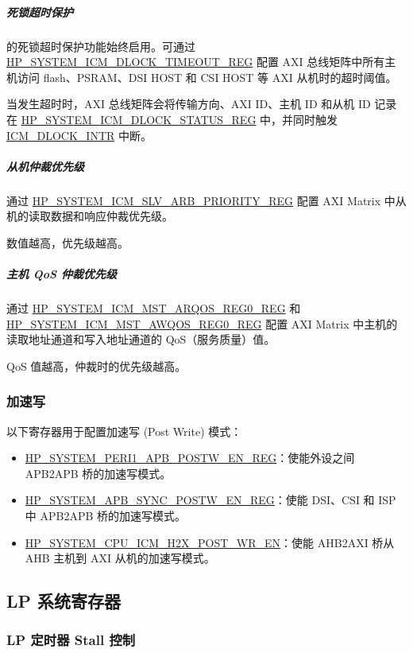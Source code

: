 \documentclass[main\_\_CN.tex]{subfiles}
\begin{document}
\subparagraph{死锁超时保护}

\chipname{} 的死锁超时保护功能始终启用。可通过 \hyperref[regdesc:HPSYSTEMICMDLOCKTIMEOUTREG]{HP\_SYSTEM\_ICM\_DLOCK\_TIMEOUT\_REG} 配置 AXI 总线矩阵中所有主机访问 flash、PSRAM、DSI HOST 和 CSI HOST 等 AXI 从机时的超时阈值。

当发生超时时，AXI 总线矩阵会将传输方向、AXI ID、主机 ID 和从机 ID 记录在 \hyperref[regdesc:HPSYSTEMICMDLOCKSTATUSREG]{HP\_SYSTEM\_ICM\_DLOCK\_STATUS\_REG} 中，并同时触发 \hyperref[tab:sysreg-int-sources]{ICM\_DLOCK\_INTR} 中断。


\subparagraph{从机仲裁优先级}

通过 \hyperref[regdesc:HPSYSTEMICMSLVARBPRIORITYREG]{HP\_SYSTEM\_ICM\_SLV\_ARB\_PRIORITY\_REG} 配置 AXI Matrix 中从机的读取数据和响应仲裁优先级。

数值越高，优先级越高。

\subparagraph{主机 QoS 仲裁优先级}

通过 \hyperref[regdesc:HPSYSTEMICMMSTARQOSREG0REG]{HP\_SYSTEM\_ICM\_MST\_ARQOS\_REG0\_REG} 和 \hyperref[regdesc:HPSYSTEMICMMSTAWQOSREG0REG]{HP\_SYSTEM\_ICM\_MST\_AWQOS\_REG0\_REG} 配置 AXI Matrix 中主机的读取地址通道和写入地址通道的 QoS（服务质量）值。

QoS 值越高，仲裁时的优先级越高。

\subsubsection{加速写}

以下寄存器用于配置加速写 (Post Write) 模式：
\begin{itemize}
    \item \hyperref[regdesc:HPSYSTEMPERI1APBPOSTWENREG]{HP\_SYSTEM\_PERI1\_APB\_POSTW\_EN\_REG}：使能外设之间 APB2APB 桥的加速写模式。
    \item \hyperref[regdesc:HPSYSTEMAPBSYNCPOSTWENREG]{HP\_SYSTEM\_APB\_SYNC\_POSTW\_EN\_REG}：使能 DSI、CSI 和 ISP 中 APB2APB 桥的加速写模式。
    \item \hyperref[fielddesc:HPSYSTEMCPUICMH2XPOSTWREN]{HP\_SYSTEM\_CPU\_ICM\_H2X\_POST\_WR\_EN}：使能 AHB2AXI 桥从 AHB 主机到 AXI 从机的加速写模式。
\end{itemize}


\newpage
\subsection{LP 系统寄存器}

\subsubsection{LP 定时器 Stall 控制}
\end{document}
